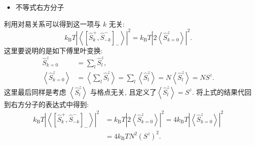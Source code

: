 \begin{itemize}
\item 不等式右方分子
\end{itemize}
利用对易关系可以得到这一项与 $k$ 无关:
\begin{equation}
k_{\mathrm{B}} T\left|\left\langle\left[\hat{S}_{k}^{+}, \hat{S}_{-k}^{-}\right]_{-}\right\rangle\right|^{2}=k_{\mathrm{B}} T\left|2\left\langle\hat{S}_{k=0}^{z}\right\rangle\right|^{2} .
\end{equation}
这里要说明的是如下傅里叶变换:
\begin{equation}
\begin{aligned}
\hat{S}_{k=0}^{z} &=\sum_{l} \hat{S}_{l}^{z}, \\
\left\langle\hat{S}_{k=0}^{z}\right\rangle &=\left\langle\sum_{l} \hat{S}_{l}^{z}\right\rangle=\sum_{l}\left\langle\hat{S}_{l}^{z}\right\rangle=N\left\langle\hat{S}_{l}^{z}\right\rangle=N S^{z} .
\end{aligned}
\end{equation}
这里最后同样是考虑 $\left\langle\hat{S}_{l}^{z}\right\rangle$ 与格点无关, 且定义了$\left\langle\hat{S}_{l}^{z}\right\rangle=S^{z}$. 将上式的结果代回到右方分子的表达式中得到:
\begin{equation}
\begin{aligned}
k_{\mathrm{B}} T\left|\left\langle\left[\hat{S}_{k}^{+}, \hat{S}_{-k}^{-}\right]_{-}\right\rangle\right|^{2} &=k_{\mathrm{B}} T\left|2\left\langle\hat{S}_{k=0}^{z}\right\rangle\right|^{2}=4 k_{\mathrm{B}} T\left|\left\langle\hat{S}_{k=0}^{z}\right\rangle\right|^{2} \\
&=4 k_{\mathrm{B}} T N^{2}\left(S^{z}\right)^{2} .
\end{aligned}
\end{equation}

